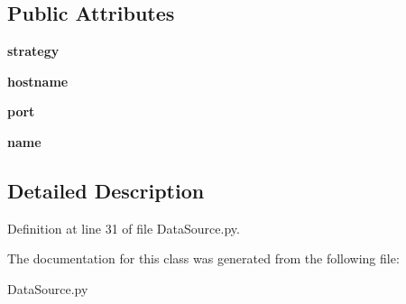 \subsection*{Public Attributes}
\begin{DoxyCompactItemize}
\item 
\hypertarget{classDataSource_1_1DataSource_a72186dfdb9c03491b8a5b2e1f0cc890a}{
{\bfseries strategy}}
\label{classDataSource_1_1DataSource_a72186dfdb9c03491b8a5b2e1f0cc890a}

\item 
\hypertarget{classDataSource_1_1DataSource_a14a4f8950ed084970fd8eb677bc59146}{
{\bfseries hostname}}
\label{classDataSource_1_1DataSource_a14a4f8950ed084970fd8eb677bc59146}

\item 
\hypertarget{classDataSource_1_1DataSource_a4db77848f62b1efc13d8e7e2b63ba627}{
{\bfseries port}}
\label{classDataSource_1_1DataSource_a4db77848f62b1efc13d8e7e2b63ba627}

\item 
\hypertarget{classDataSource_1_1DataSource_aa4461dfafb92f4aae91c005d27ae7f97}{
{\bfseries name}}
\label{classDataSource_1_1DataSource_aa4461dfafb92f4aae91c005d27ae7f97}

\end{DoxyCompactItemize}


\subsection{Detailed Description}


Definition at line 31 of file DataSource.py.

The documentation for this class was generated from the following file:\begin{DoxyCompactItemize}
\item 
DataSource.py\end{DoxyCompactItemize}
